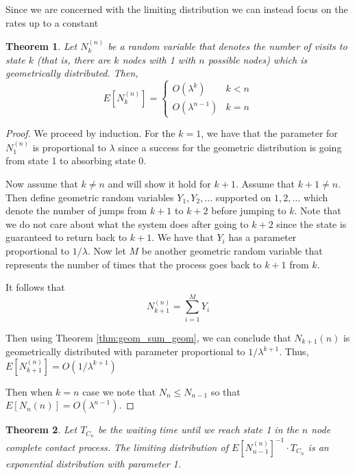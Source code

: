 \documentclass{article}
\theoremstyle{plain}
\newtheorem{theorem}{Theorem}[section]
\theoremstyle{definition}
\theoremstyle{remark}
\numberwithin{equation}{section}
\begin{document}
Since we are concerned with the limiting distribution we can instead focus on the rates up to a constant

\begin{theorem}
Let $N_k^{(n)}$ be a random variable that denotes the number of visits to state $k$ (that is, there are $k$ nodes with 1 with $n$ possible nodes) which is geometrically distributed. Then,
$$
E[N_k^{(n)}] = \begin{cases}
    O(\lambda^k) & k < n\\
    O(\lambda^{n - 1}) & k = n
\end{cases}
$$
\end{theorem}

\begin{proof}
We proceed by induction.
For the $k = 1$, we have that the parameter for $N_1^{(n)}$ is proportional to $\lambda$ since a success for the geometric distribution is going from state 1 to absorbing state 0.

Now assume that $k \not = n$ and will show it hold for $k + 1$.
Assume that $k + 1 \not = n$.
Then define geometric random variables $Y_1, Y_2, \ldots$ supported on $1,2,\ldots$ which denote the number of jumps from $k + 1$ to $k + 2$ before jumping to $k$.
Note that we do not care about what the system does after going to $k + 2$ since the state is guaranteed to return back to $k + 1$.
We have that $Y_i$ has a parameter proportional to $1/\lambda$.
Now let $M$ be another geometric random variable that represents the number of times that the process goes back to $k + 1$ from $k$.

It follows that
\begin{equation}
   N_{k + 1}^{(n)} = \sum_{i = 1}^M Y_i
\end{equation}

Then using Theorem \eqref{thm:geom_sum_geom}, we can conclude that $N_{k + 1}{(n)}$ is geometrically distributed with parameter proportional to $1/\lambda^{k + 1}$.
Thus, $E[N_{k + 1}^{(n)}] = O(1/\lambda^{k + 1})$

Then when $k = n$ case we note that $N_n \leq N_{n - 1}$ so that $E[N_{n}{(n)}] = O(\lambda^{n - 1})$.
\end{proof}

\begin{theorem}
Let $T_{C_n}$ be the waiting time until we reach state 1 in the $n$ node complete contact process.
The limiting distribution of $E[N_{n-1}^{(n)}]^{-1} \cdot T_{C_n}$ is an exponential distribution with parameter 1.
\end{theorem}
\end{document}
